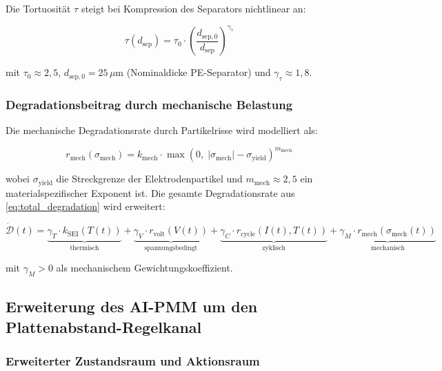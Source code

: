 ﻿\documentclass[12pt,a4paper]{article}
\begin{document}
Die Tortuosität $\tau$ steigt bei Kompression des Separators nichtlinear an:

\begin{equation}
	\tau(d_\mathrm{sep}) = \tau_0 \cdot \left(\frac{d_\mathrm{sep,0}}{d_\mathrm{sep}}\right)^{\!\gamma_\tau}
	\label{eq:tortuosity}
\end{equation}

mit $\tau_0 \approx 2{,}5$, $d_\mathrm{sep,0} = 25\,\mu\mathrm{m}$
(Nominaldicke PE-Separator) und $\gamma_\tau \approx 1{,}8$.

\subsubsection{Degradationsbeitrag durch mechanische Belastung}

Die mechanische Degradationsrate durch Partikelrisse wird modelliert als:

\begin{equation}
	r_\mathrm{mech}(\sigma_\mathrm{mech}) = k_\mathrm{mech}
	\cdot \max\!\left(0,\; |\sigma_\mathrm{mech}| - \sigma_\mathrm{yield}\right)^{\!m_\mathrm{mech}}
	\label{eq:mech_deg_rate}
\end{equation}

wobei $\sigma_\mathrm{yield}$ die Streckgrenze der Elektrodenpartikel und
$m_\mathrm{mech} \approx 2{,}5$ ein materialspezifischer Exponent ist.
Die gesamte Degradationsrate aus \eqref{eq:total_degradation} wird erweitert:

\begin{equation}
	\dot{\mathcal{D}}(t) = \underbrace{\gamma_T \cdot k_\mathrm{SEI}(T(t))}_{\text{thermisch}}
	+ \underbrace{\gamma_V \cdot r_\mathrm{volt}(V(t))}_{\text{spannungsbedingt}}
	+ \underbrace{\gamma_C \cdot r_\mathrm{cycle}(I(t), T(t))}_{\text{zyklisch}}
	+ \underbrace{\gamma_M \cdot r_\mathrm{mech}(\sigma_\mathrm{mech}(t))}_{\text{mechanisch}}
	\label{eq:total_degradation_extended}
\end{equation}

mit $\gamma_M > 0$ als mechanischem Gewichtungskoeffizient.

\subsection{Erweiterung des AI-PMM um den Plattenabstand-Regelkanal}

\subsubsection{Erweiterter Zustandsraum und Aktionsraum}
\end{document}
